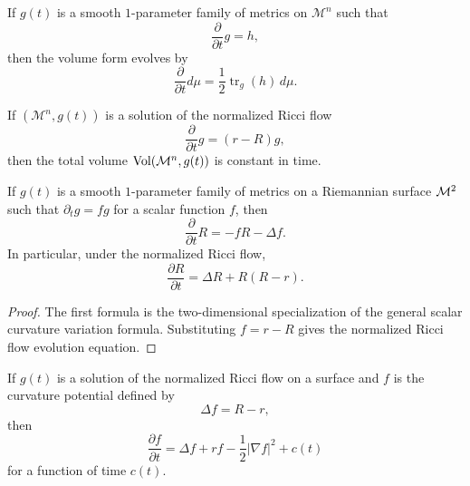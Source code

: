 \begin{corollary}
\label{ch05-cor-area-form-evolution}
If \(g(t)\) is a smooth \(1\)-parameter family of metrics on \(\mathcal{M}^n\) such that
\[
\frac{\partial}{\partial t}g = h,
\]
then the volume form evolves by
\[
\frac{\partial}{\partial t}d\mu = \frac12 \operatorname{tr}_g(h)\,d\mu.
\]
\end{corollary}

\begin{corollary}
\label{ch05-cor-area-preservation}
If \((\mathcal{M}^n,g(t))\) is a solution of the normalized Ricci flow
\[
\frac{\partial}{\partial t}g=(r-R)g,
\]
then the total volume \(\operatorname{Vol}(\mathcal M^n,g(t))\) is constant in time.
\end{corollary}

\begin{lemma}
\label{ch05-lem-scalar-curvature-evolution-surface}
If \(g(t)\) is a smooth \(1\)-parameter family of metrics on a Riemannian surface \(\mathcal{M}^2\) such that \(\partial_t g = f g\) for a scalar function \(f\), then
\[
\frac{\partial}{\partial t}R = -fR -\Delta f.
\]
In particular, under the normalized Ricci flow,
\[
\frac{\partial R}{\partial t}=\Delta R+R(R-r).
\]
\end{lemma}

\begin{proof}
The first formula is the two-dimensional specialization of the general scalar curvature variation formula. Substituting \(f=r-R\) gives the normalized Ricci flow evolution equation.
\end{proof}

\begin{corollary}
\label{ch05-cor-curvature-potential-evolution}
If \(g(t)\) is a solution of the normalized Ricci flow on a surface and \(f\) is the curvature potential defined by
\[
\Delta f = R-r,
\]
then
\[
\frac{\partial f}{\partial t}=\Delta f + r f - \frac12 |\nabla f|^2 + c(t)
\]
for a function of time \(c(t)\).
\end{corollary}


